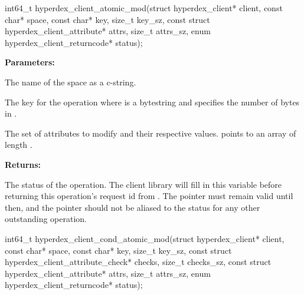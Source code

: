 \funcsep
{}
\begin{ccode}
int64_t hyperdex_client_atomic_mod(struct hyperdex_client* client,
                const char* space,
                const char* key, size_t key_sz,
                const struct hyperdex_client_attribute* attrs, size_t attrs_sz,
                enum hyperdex_client_returncode* status);
\end{ccode}
\funcdesc 

\noindent\textbf{Parameters:}
\begin{description}[labelindent=\widthof{{\code{attrs}, \code{attrs\_sz}}},leftmargin=*,noitemsep,nolistsep,align=right]
\item[\code{space}] The name of the space as a c-string.
\item[\code{key}, \code{key\_sz}] The key for the operation where  is a bytestring and  specifies the number of bytes in .
\item[\code{attrs}, \code{attrs\_sz}] The set of attributes to modify and their respective values.   points to an array of length .
\end{description}

\noindent\textbf{Returns:}
\begin{description}[labelindent=\widthof{{\code{status}}},leftmargin=*,noitemsep,nolistsep,align=right]
\item[\code{status}] The status of the operation.  The client library will fill in this variable before returning this operation's request id from .  The pointer must remain valid until then, and the pointer should not be aliased to the status for any other outstanding operation.
\end{description}

\funcsep
{}
\begin{ccode}
int64_t hyperdex_client_cond_atomic_mod(struct hyperdex_client* client,
                const char* space,
                const char* key, size_t key_sz,
                const struct hyperdex_client_attribute_check* checks, size_t checks_sz,
                const struct hyperdex_client_attribute* attrs, size_t attrs_sz,
                enum hyperdex_client_returncode* status);
\end{ccode}
\funcdesc 

